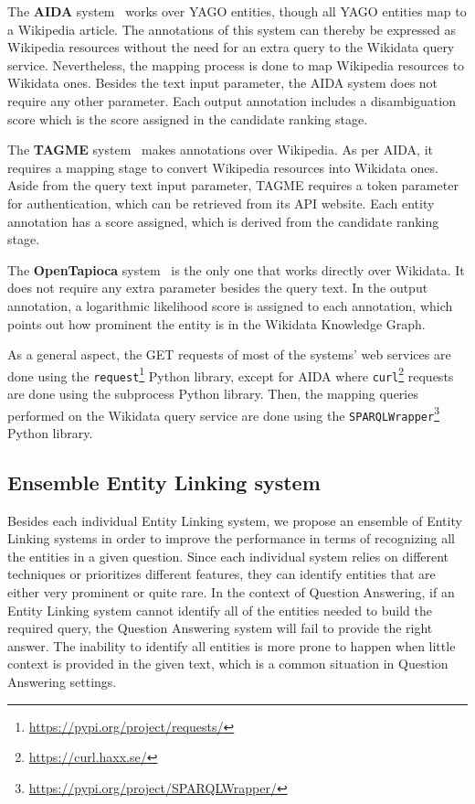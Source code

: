 The \textbf{AIDA} system~\cite{EL:aida-tool-YosefHBSW11, EL:aida-HoffartYBFPSTTW11} works over 
YAGO entities, though all YAGO entities map to a Wikipedia article. The annotations of this 
system can thereby be expressed as Wikipedia resources without the need for an extra query to 
the Wikidata query service. Nevertheless, the mapping process is done to map Wikipedia resources 
to Wikidata ones. Besides the text input parameter, the AIDA system does not require any other 
parameter. Each output annotation includes a disambiguation score which is the score assigned 
in the candidate ranking stage.

The \textbf{TAGME} system~\cite{EL:tagme-FerraginaS10} makes annotations over Wikipedia. As 
per AIDA, it requires a mapping stage to convert Wikipedia resources into Wikidata ones. 
Aside from the query text input parameter, TAGME requires a token parameter for authentication, 
which can be retrieved from its API website. Each entity annotation has a  score 
assigned, which is derived from the candidate ranking stage.

The \textbf{OpenTapioca} system~\cite{EL:opentapioca-Delpeuch19} is the only one that works 
directly over Wikidata. It does not require any extra parameter besides the query text. In 
the output annotation, a logarithmic likelihood score is assigned to each annotation, which 
points out how prominent the entity is in the Wikidata Knowledge Graph.

As a general aspect, the GET requests of most of the systems’ web services are done using the 
\texttt{request}\footnote{\url{https://pypi.org/project/requests/}} Python library, except for AIDA 
where \texttt{curl}\footnote{\url{https://curl.haxx.se/}} requests are done using the subprocess 
Python library. Then, the mapping queries performed on the Wikidata query service are done 
using the \texttt{SPARQLWrapper}\footnote{\url{https://pypi.org/project/SPARQLWrapper/}} Python 
library.

\subsection{Ensemble Entity Linking system}
\label{cap3:system/entLinModule/ensembleSystems}
Besides each individual Entity Linking system, we propose an ensemble of Entity Linking systems 
in order to improve the performance in terms of recognizing all the entities in a given 
question. Since each individual system relies on different techniques or prioritizes different 
features, they can identify entities that are either very prominent or quite rare. In the 
context of Question Answering, if an Entity Linking system cannot identify all of the entities 
needed to build the required \SPARQL{} query, the Question Answering system will fail to provide 
the right answer. The inability to identify all entities is more prone to happen when little 
context is provided in the given text, which is a common situation in Question Answering 
settings.

